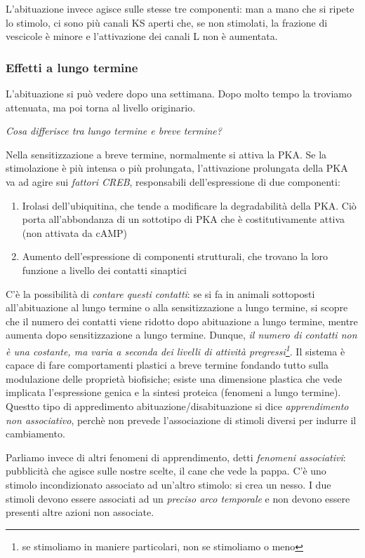 \documentclass[a4paper,12pt]{article}
\begin{document}
L'abituazione invece agisce sulle stesse tre componenti: man a mano che si ripete lo stimolo, ci sono più canali KS aperti che, se non stimolati, la frazione di vescicole è minore e l'attivazione dei canali L non è aumentata.

\subsubsection{Effetti a lungo termine}
L'abituazione si può vedere dopo una settimana. Dopo molto tempo la troviamo attenuata, ma poi torna al livello originario.

\emph{Cosa differisce tra lungo termine e breve termine?}

Nella sensitizzazione a breve termine, normalmente si attiva la PKA. Se la stimolazione è più intensa o più prolungata, l'attivazione prolungata della PKA va ad agire sui \emph{fattori CREB}, responsabili dell'espressione di due componenti:
\begin{enumerate}
\item{Irolasi dell'ubiquitina, che tende a modificare la degradabilità della PKA. Ciò porta all'abbondanza di un sottotipo di PKA che è costitutivamente attiva (non attivata da cAMP)}
\item{Aumento dell'espressione di componenti strutturali, che trovano la loro funzione a livello dei contatti sinaptici}
\end{enumerate}

C'è la possibilità di \emph{contare questi contatti}: se si fa in animali sottoposti all'abituazione al lungo termine o alla sensitizzazione a lungo termine, si scopre che il numero dei contatti viene ridotto dopo abituazione a lungo termine, mentre aumenta dopo sensitizzazione a lungo termine. Dunque, \emph{il numero di contatti non è una costante, ma varia a seconda dei livelli di attività pregressi\footnote{se stimoliamo in maniere particolari, non se stimoliamo o meno}}. Il sistema è capace di fare comportamenti plastici a breve termine fondando tutto sulla modulazione delle proprietà biofisiche; esiste una dimensione plastica che vede implicata l'espressione genica e la sintesi proteica (fenomeni a lungo termine). Questto tipo di appredimento abituazione/disabituazione si dice \emph{apprendimento non associativo}, perchè non prevede l'associazione di stimoli diversi per indurre il cambiamento.

Parliamo invece di altri fenomeni di apprendimento, detti \emph{fenomeni associativi}: pubblicità che agisce sulle nostre scelte, il cane che vede la pappa. 
C'è uno stimolo incondizionato associato ad un'altro stimolo: si crea un nesso. I due stimoli devono essere associati ad un \emph{preciso arco temporale} e non devono essere presenti altre azioni non associate.
\end{document}
